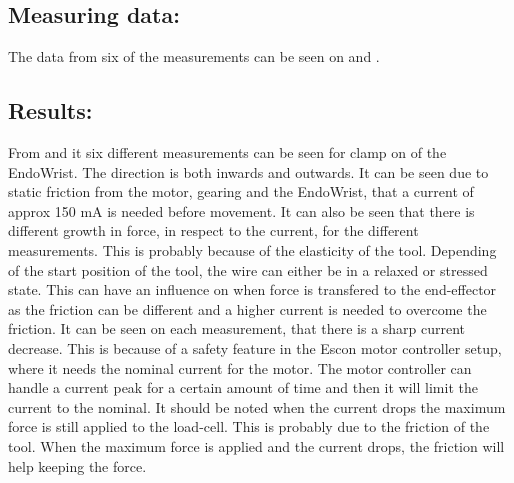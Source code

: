 \subsection*{Measuring data:}
The data from six of the measurements can be seen on  and .





%

%




\subsection*{Results:}
From  and  it six different measurements can be seen for clamp on of the EndoWrist. The direction is both inwards and outwards. It can be seen due to static friction from the motor, gearing and the EndoWrist, that a current of approx 150 mA is needed before movement. It can also be seen that there is different growth in force, in respect to the current, for the different measurements. This is probably because of the elasticity of the tool. Depending of the start position of the tool, the wire can either be in a relaxed or stressed state. This can have an influence on when force is transfered to the end-effector as the friction can be different and a higher current is needed to overcome the friction. It can be seen on each measurement, that there is a sharp current decrease. This is because of a safety feature in the Escon motor controller setup, where it needs the nominal current for the motor. The motor controller can handle a current peak for a certain amount of time and then it will limit the current to the nominal. It should be noted when the current drops the maximum force is still applied to the load-cell. This is probably due to the friction of the tool. When the maximum force is applied and the current drops, the friction will help keeping the force.

